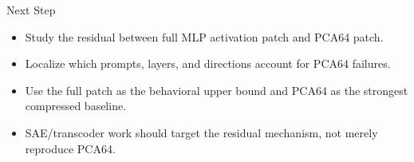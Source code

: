 \documentclass[aspectratio=169]{beamer}
\begin{document}
\begin{frame}{Next Step}
  \begin{itemize}
    \item Study the residual between full MLP activation patch and PCA64 patch.
    \item Localize which prompts, layers, and directions account for PCA64 failures.
    \item Use the full patch as the behavioral upper bound and PCA64 as the strongest compressed baseline.
    \item SAE/transcoder work should target the residual mechanism, not merely reproduce PCA64.
  \end{itemize}
\end{frame}
\end{document}
